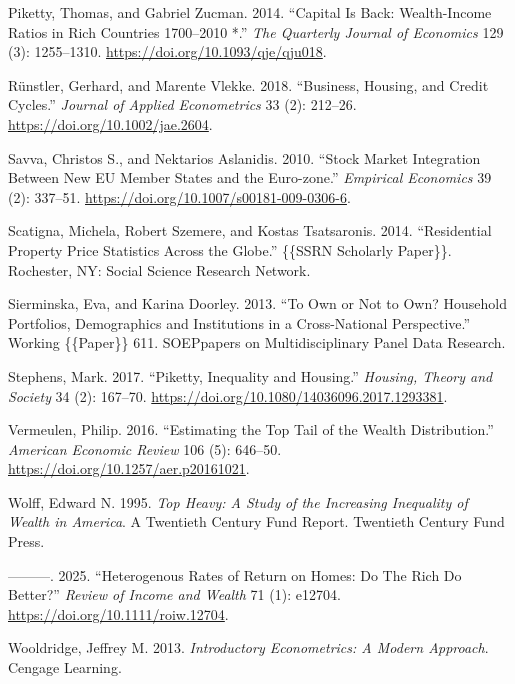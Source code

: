 \documentclass[
  a4paper,
  DIV=11,
  numbers=noendperiod]{scrartcl}
\newlength{\cslhangindent}
\newenvironment{CSLReferences}[2] %
 {\begin{list}{}{%
  \setlength{\itemindent}{0pt}
  \setlength{\leftmargin}{0pt}
  \setlength{\parsep}{0pt}
  \ifodd #1
   \setlength{\leftmargin}{\cslhangindent}
   \setlength{\itemindent}{-1\cslhangindent}
  \fi
  \setlength{\itemsep}{#2\baselineskip}}}
 {\end{list}}
\begin{document}
\begin{CSLReferences}{1}{0}
Piketty, Thomas, and Gabriel Zucman. 2014. {``Capital Is {Back}:
{Wealth-Income Ratios} in {Rich Countries} 1700--2010 *.''} \emph{The
Quarterly Journal of Economics} 129 (3): 1255--1310.
\url{https://doi.org/10.1093/qje/qju018}.

Rünstler, Gerhard, and Marente Vlekke. 2018. {``Business, Housing, and
Credit Cycles.''} \emph{Journal of Applied Econometrics} 33 (2):
212--26. \url{https://doi.org/10.1002/jae.2604}.

Savva, Christos S., and Nektarios Aslanidis. 2010. {``Stock Market
Integration Between New {EU} Member States and the {Euro-zone}.''}
\emph{Empirical Economics} 39 (2): 337--51.
\url{https://doi.org/10.1007/s00181-009-0306-6}.

Scatigna, Michela, Robert Szemere, and Kostas Tsatsaronis. 2014.
{``Residential {Property Price Statistics Across} the {Globe}.''}
\{\{SSRN Scholarly Paper\}\}. Rochester, NY: Social Science Research
Network.

Sierminska, Eva, and Karina Doorley. 2013. {``To Own or Not to Own?
{Household} Portfolios, Demographics and Institutions in a
Cross-National Perspective.''} Working \{\{Paper\}\} 611. SOEPpapers on
Multidisciplinary Panel Data Research.

Stephens, Mark. 2017. {``Piketty, {Inequality} and {Housing}.''}
\emph{Housing, Theory and Society} 34 (2): 167--70.
\url{https://doi.org/10.1080/14036096.2017.1293381}.

Vermeulen, Philip. 2016. {``Estimating the {Top Tail} of the {Wealth
Distribution}.''} \emph{American Economic Review} 106 (5): 646--50.
\url{https://doi.org/10.1257/aer.p20161021}.

Wolff, Edward N. 1995. \emph{Top Heavy: A Study of the Increasing
Inequality of Wealth in {America}}. A {Twentieth Century Fund} Report.
Twentieth Century Fund Press.

---------. 2025. {``Heterogenous {Rates} of {Return} on {Homes}: {Do The
Rich Do Better}?''} \emph{Review of Income and Wealth} 71 (1): e12704.
\url{https://doi.org/10.1111/roiw.12704}.

Wooldridge, Jeffrey M. 2013. \emph{Introductory {Econometrics}: {A
Modern Approach}}. Cengage Learning.

\end{CSLReferences}

\newpage{}
\end{document}
